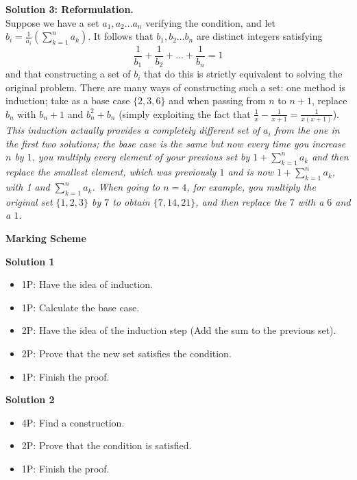 {\textbf{Solution 3: Reformulation.}\\ Suppose we have a set $a_1, a_2 \dots a_n$ verifying the condition, and let $b_i = \frac{1}{a_i}(\sum_{k=1}^n a_k)$. It follows that $b_1, b_2 \dots b_n$ are distinct integers satisfying 
\[
\frac{1}{b_1}+\frac{1}{b_2}+\dots+\frac{1}{b_n} = 1
\]
and that constructing a set of $b_i$ that do this is strictly equivalent to solving the original problem. There are many ways of constructing such a set: one method is induction; take as a base case $\{2, 3, 6\}$ and when passing from $n$ to $n+1$, replace $b_n$ with $b_n+1$ and $b_n^2+b_n$ (simply exploiting the fact that $\frac{1}{x}-\frac{1}{x+1} = \frac{1}{x(x+1)}$). \\
\emph{This induction actually provides a completely different set of $a_i$ from the one in the first two solutions; the base case is the same but now every time you increase $n$ by $1$, you multiply every element of your previous set by $1 + \sum_{k=1}^n a_k$ and then replace the smallest element, which was previously $1$ and is now $1 + \sum_{k=1}^n a_k$, with 1 and $\sum_{k=1}^n a_k$. When going to $n = 4$, for example, you multiply the original set $\{1, 2, 3\}$ by $7$ to obtain $\{7, 14, 21\}$, and then replace the $7$ with a $6$ and a $1$.}

\bigskip
\textbf{Marking Scheme}

\textbf{Solution 1}
\begin{itemize}
\item 1P: Have the idea of induction.
\item 1P: Calculate the base case.
\item 2P: Have the idea of the induction step (Add the sum to the previous set).
\item 2P: Prove that the  new set satisfies the condition.
\item 1P: Finish the proof.
\end{itemize}
\textbf{Solution 2}
\begin{itemize}
\item 4P: Find a construction.
\item 2P: Prove that the condition is satisfied.
\item 1P: Finish the proof.
\end{itemize}
}

